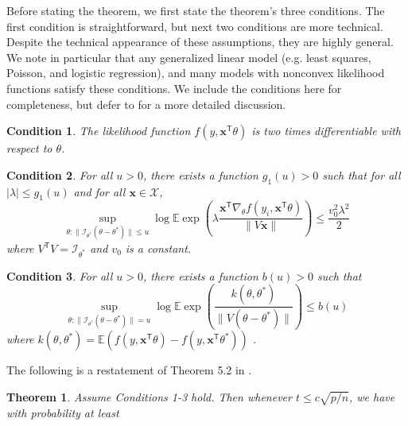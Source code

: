 \documentclass[twoside]{article}
\newtheorem{theorem}{Theorem}
\newtheorem{assumption}{Condition}
\DeclareMathOperator*{\subG}{subG}
\newcommand{\X}{\mathcal{X}}
\newcommand{\E}{\mathbb{E}}
\newcommand{\x}{\mathbf{x}}
\newcommand{\w}{\theta}
\newcommand{\wstar}{{\w^{*}}}
\newcommand{\I}{\mathcal I}
\newcommand{\subnormal}[1]{\ensuremath{\subG\left({{#1}}\right)}}
\newcommand{\trans}[1]{\ensuremath{{#1}^{\mathsf{T}}}}
\newcommand{\ltwo}[1]{{\lVert {#1} \rVert}}
\begin{document}
Before stating the theorem, we first state the theorem's three conditions.
The first condition is straightforward,
but next two conditions are more technical.
Despite the technical appearance of these assumptions,
they are highly general.
We note in particular that any generalized linear model (e.g. least squares, Poisson, and logistic regression),
and many models with nonconvex likelihood functions satisfy these conditions.
We include the conditions here for completeness,
but defer to \cite{spokoiny2012parametricestimation} for a more detailed discussion.

\begin{assumption}
The likelihood function $f(y,\trans\x\w)$ is two times differentiable with respect to $\w$.
\end{assumption}
\begin{assumption}
For all $u>0$, there exists a function $g_1(u)>0$ such that for all $|\lambda| \le g_1(u)$
and for all $\x\in\X$,
\begin{equation}
\sup_{\w:\ltwo{\I_\wstar(\w-\wstar)} \le u}
\log\E\exp\left(\lambda\frac{\trans\x\nabla_\w f(y_i,\trans\x\w)}{\ltwo{V\x}}\right)
\le
\frac{v_0^2\lambda^2}{2}
\end{equation}
where $\trans V V = \I_\wstar$ and $v_0$ is a constant.
\end{assumption}
\begin{assumption}
For all $u>0$, there exists a function $b(u)>0$ such that
\begin{equation}
\sup_{\w:\ltwo{\I_\wstar(\w-\wstar)} = u}
\log\E\exp\left(\frac{k(\w,\wstar)}{\ltwo{V(\w-\wstar)}}\right)
\le
b(u)
\end{equation}
where
$
k(\w,\wstar) = \E\left(f(y,\trans\x\w) - f(y,\trans\x\wstar)\right)
$
.
\end{assumption}

The following is a restatement of Theorem 5.2 in \cite{spokoiny2012parametricestimation}.
\begin{theorem}
Assume Conditions 1-3 hold.
Then whenever $t \le c\sqrt{p/n}$,
we have with probability at least
\end{theorem}
\end{document}
